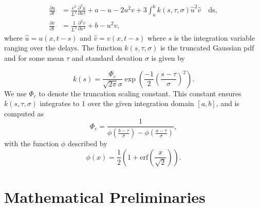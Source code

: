 \begin{equation}
  \begin{split}
    \frac{\partial u}{\partial t}&=\frac{\epsilon^2}{L^2}\frac{\partial^2u}{\partial x^2}+a-u-2u^2v+3\int_{a}^{b}k(s,\tau,\sigma)\hat{u}^2\hat{v} \quad\text{ds},\\
    \frac{\partial v}{\partial t}&=\frac{1}{L^2}\frac{\partial^2v}{\partial x^2}+b-u^2v,
\end{split}
\end{equation}
where $\hat{u}=u(x,t-s)$ and $\hat{v}=v(x,t-s)$ where $s$ is the integration variable ranging over the delays. The function $k(s,\tau,\sigma)$ is the truncated Gaussian pdf and for some mean $\tau$ and standard devation $\sigma$ is given by \cite{wikitrunc}

\begin{equation}
  k(s)=\frac{\Phi_c}{\sqrt{2\pi}\sigma}\exp\left(\frac{-1}{2}\left(\frac{s-\tau}{\sigma}\right)^2\right).
\end{equation}
We use $\Phi_c$ to denote the truncation scaling constant. This constant ensures $k(s,\tau,\sigma)$ integrates to $1$ over the given integration domain $[a, b]$, and is computed as
\begin{equation}
\Phi_c=\frac{1}{\phi\left(\frac{b-\tau}{\sigma}\right)-\phi\left(\frac{a-\tau}{\sigma}\right)},
\end{equation}
with the function $\phi$ described by
\begin{equation}
\phi(x)=\frac{1}{2}\left(1+\text{erf}\left(\frac{x}{\sqrt{2}}\right)\right).
\end{equation}

\section{Mathematical Preliminaries}

